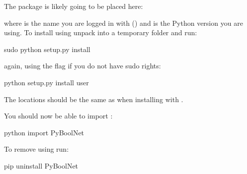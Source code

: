 \documentclass[letterpaper,10pt,english]{sphinxmanual}
\begin{document}
The package is likely going to be placed here:

\begin{sphinxVerbatim}[commandchars=\\\{\}]
\end{sphinxVerbatim}

where  is the name you are logged in with () and  is the Python version you are using.
To install  using  unpack  into a temporary folder and run:

\begin{sphinxVerbatim}[commandchars=\\\{\}]
\PYGZdl{} sudo python setup.py install
\end{sphinxVerbatim}

again, using the  flag if you do not have sudo rights:

\begin{sphinxVerbatim}[commandchars=\\\{\}]
\PYGZdl{} python setup.py install \PYGZhy{}\PYGZhy{}user
\end{sphinxVerbatim}

The locations should be the same as when installing with .

You should now be able to import :

\begin{sphinxVerbatim}[commandchars=\\\{\}]
\PYGZdl{} python
\PYGZgt{}\PYGZgt{}\PYGZgt{} import PyBoolNet
\end{sphinxVerbatim}

To remove  using  run:

\begin{sphinxVerbatim}[commandchars=\\\{\}]
\PYGZdl{} pip uninstall PyBoolNet
\end{sphinxVerbatim}
\end{document}
